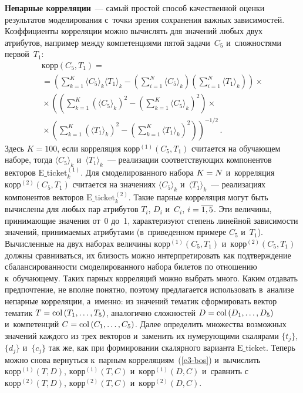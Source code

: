 \begin{multicols}{2}
  \textbf{Непарные корреляции}~--- самый простой способ качественной оценки 
результатов моделирования с~точки зрения сохранения важных 
зависимостей. Коэффициенты корреляции можно вычислять для значений 
любых двух атрибутов, например между компетенциями пятой задачи~$C_5$ 
и~сложностями первой~$T_1$: 
  \begin{multline}
 \mathrm{корр}(C_5,T_1) ={}\\
 {}=\left(
\sum\limits_{k=1}^K \langle C_5\rangle_k \langle T_1\rangle_k - \left( 
\sum\limits^N_{i=1}\langle C_5\rangle_k\right) \left( \sum\limits^N_{i=1} 
\langle T_1\rangle_k\right)\right)\times\\
{}\times
\left(
  \left( \sum\limits^K_{k=1}\left(\langle C_5\rangle_k\right)^2 -
\left(\sum\limits^K_{k=1} \langle C_5\rangle_k\right)^2\right) \times{}\right.\\
\left.{}\times\left( 
\sum\limits^K_{k=1} \left(\langle T_1\rangle_k\right)^2 -\left(\sum\limits^K_{k=1} 
\langle T_1\rangle_k\right)^2\right)\right)^{-1/2}\,.
  \label{e3-bos}
  \end{multline}
  Здесь $K=100$, если корреляция $\mathrm{корр}^{(1)}(C_5, T_1)$ считается на 
обучающем наборе, тогда $\langle C_5\rangle_k$ и~$\langle T_1\rangle_k$~--- 
реализации соответствующих компонентов векторов $\mathrm{E\_ticket}_k^{(1)}$. Для 
смоделированного набора $K\hm= N$ и~корреляция $\mathrm{корр}^{(2)}(C_5, 
T_1)$ считается на значениях $\langle C_5\rangle_k$ и~$\langle T_1\rangle_k$~--- 
реализациях компонентов векторов $\mathrm{E\_ticket}_k^{(2)}$. Такие парные 
корреляция могут быть вычислены для любых пар атрибутов $T_i$, $D_i$ 
и~$C_i$, $i\hm=\overline{1, 5}$. Эти величины, принимающие значения от~0 до~1, 
характеризуют степень линейной зависимости значений, принимаемых 
атрибутами (в~приведенном примере $C_5$ и~$T_1$). Вы\-чис\-лен\-ные на двух 
наборах величины $\mathrm{корр}^{(1)}(C_5, T_1)$ и~$\mathrm{корр}^{(2)}(C_5, 
T_1)$ долж\-ны сравниваться, их бли\-зость можно интерпретировать как 
подтверждение сба\-лан\-си\-ро\-ван\-ности смоделированного набора билетов по 
отношению к~обуча\-ющему.
  Таких парных корреляций можно выбрать много. Каким отдавать\linebreak 
предпочтение, не вполне понятно, поэтому предлагается использовать 
в~анализе непарные корреляции, а~именно: из значений тематик 
сформировать вектор тематик $T\hm= \mathrm{col}\,(T_1, \ldots , T_5)$, 
\mbox{аналогично} сложностей $D\hm= \mathrm{col}\,(D_1, \ldots , D_5)$ и~компетенций $C\hm= \mathrm{col}\,(C_1, \ldots , C_5)$. Далее определить 
множества возможных значений каждого из трех векторов и~заменить их 
ну\-ме\-ру\-ющи\-ми скалярами $\{t_j\}$, $\{d_j\}$ и~$\{c_j\}$ так же, как при 
формировании скалярного варианта $\mathrm{E\_ticket}$. Теперь мож\-но снова 
вернуться к~парным корреляциям~(\ref{e3-bos}) и~вы\-чис\-лить 
$\mathrm{корр}^{(1)}(T,D)$, $\mathrm{корр}^{(1)}(T,C)$ 
и~$\mathrm{корр}^{(1)}(D,C)$ и~сравнить с~$\mathrm{корр}^{(2)}(T,D)$, 
$\mathrm{корр}^{(2)}(T,C)$ и~$\mathrm{корр}^{(2)}(D,C)$.
  

\end{multicols}
